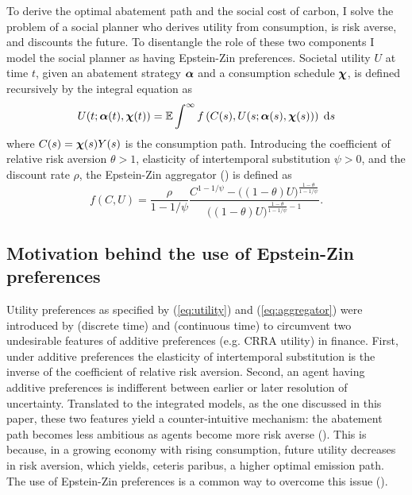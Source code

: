 \documentclass[../../main.tex]{subfiles}
\begin{document}
To derive the optimal abatement path and the social cost of carbon, I solve the problem of a social planner who derives utility from consumption, is risk averse, and discounts the future. To disentangle the role of these two components I model the social planner as having Epstein-Zin preferences. Societal utility $U$ at time $t$, given an abatement strategy $\bm{\alpha}$ and a consumption schedule $\bm{\chi}$, is defined recursively by the integral equation as \begin{equation} \label{eq:utility}
    U(t; \bm{\alpha}(t), \bm{\chi}(t)) = \operatorname{\mathbb{E}} \int^{\infty} f\left(C(s), U(s; \bm{\alpha}(s), \bm{\chi}(s))\right) \; \mathrm{d}s
\end{equation} where $C(s) = \bm{\chi}(s) Y(s)$ is the consumption path. Introducing the coefficient of relative risk aversion $\theta > 1$, elasticity of intertemporal substitution $\psi > 0$, and the discount rate $\rho$, the Epstein-Zin aggregator (\cite{duffie_asset_1992}) is defined as \begin{equation} \label{eq:aggregator}
    f(C, U) = \frac{\rho}{1 - 1 / \psi} \frac{C^{1 - 1 / \psi} - \big((1- \theta) U\big)^{\frac{1 - \theta}{1 - 1 / \psi}}}{\big((1- \theta) U\big)^{\frac{1 - \theta}{1 - 1 / \psi} - 1}}.
\end{equation}

\subsection{Motivation behind the use of Epstein-Zin preferences}

Utility preferences as specified by (\ref{eq:utility}) and (\ref{eq:aggregator}) were introduced by  (discrete time) and  (continuous time) to circumvent two undesirable features of additive preferences (e.g. CRRA utility) in finance. First, under additive preferences the elasticity of intertemporal substitution is the inverse of the coefficient of relative risk aversion. Second, an agent having additive preferences is indifferent between earlier or later resolution of uncertainty. Translated to the integrated models, as the one discussed in this paper, these two features yield a counter-intuitive mechanism: the abatement path becomes less ambitious as agents become more risk averse (\cite{pindyck_economic_2013}). This is because, in a growing economy with rising consumption, future utility decreases in risk aversion, which yields, ceteris paribus, a higher optimal emission path. The use of Epstein-Zin preferences is a common way to overcome this issue (\cite{pindyck_economic_2013, crost_optimal_2013, ackerman_epsteinzin_2013, hambel_optimal_2021,  olijslagers_discounting_2019}).
\end{document}
